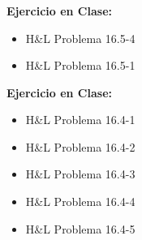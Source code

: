 \documentclass[ 10pt, xcolor = dvipsnames]{beamer}
\begin{document}
\begin{frame}[allowframebreaks]
\frametitle{\insertsubsection}

\textbf{Ejercicio en Clase:}
\begin{itemize}
\item H\&L Problema 16.5-4
\item H\&L Problema 16.5-1
\end{itemize}
\fullskip

\textbf{Ejercicio en Clase:}
\begin{itemize}
\item H\&L Problema 16.4-1
\item H\&L Problema 16.4-2
\item H\&L Problema 16.4-3
\item H\&L Problema 16.4-4
\item H\&L Problema 16.4-5
\end{itemize}

\end{frame}
\end{document}

